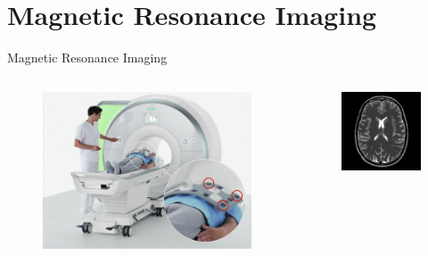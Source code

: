 \section{Magnetic Resonance Imaging}

\begin{frame}[c]{Magnetic Resonance Imaging}
	\begin{columns}[c, onlytextwidth]
		\begin{column}{0.5\textwidth}
			\centering{}
			\begin{figure}[k]
				\centering

				\includegraphics[width=\linewidth]{images/coils.jpg}
			\end{figure}
		\end{column}\begin{column}{0.5\textwidth}
			\begin{figure}[]
				\includegraphics[width=0.8\linewidth]{images/parallel_full}
			\end{figure}
		\end{column}
	\end{columns}


\end{frame}
